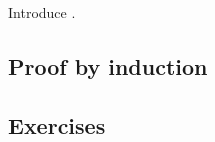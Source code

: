 \begin{draft}
Introduce .




\subsection{Proof by induction}
\label{sec:pi}







\subsection{Exercises}



\begin{comment}%
why, what caused X?
how did X occur?
what-if? what-if-not?
how does X compare with Y?
what is the evidence for X?
why is X important?
\end{comment}





\end{draft}
